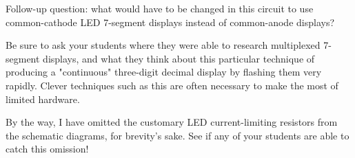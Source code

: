 \vskip 10pt

Follow-up question: what would have to be changed in this circuit to use common-cathode LED 7-segment displays instead of common-anode displays?







Be sure to ask your students where they were able to research multiplexed 7-segment displays, and what they think about this particular technique of producing a "continuous" three-digit decimal display by flashing them very rapidly.  Clever techniques such as this are often necessary to make the most of limited hardware.

By the way, I have omitted the customary LED current-limiting resistors from the schematic diagrams, for brevity's sake.  See if any of your students are able to catch this omission!




